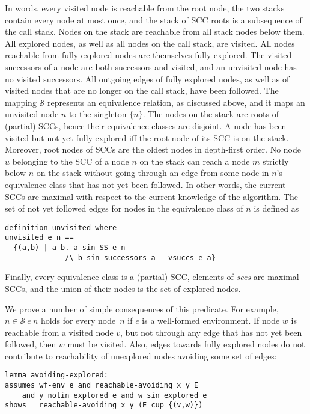 \documentclass[sigplan,10pt,anonymous,review]{acmart}
\newcommand{\prog}[1]{\textit{#1}}
\renewcommand{\SS}{\mathcal{S}}
\begin{document}
In words, every visited node is reachable from the root node, the two stacks contain every node at most once, and the stack of SCC roots is a subsequence of the call stack. Nodes on the stack are reachable from all stack nodes below them. All explored nodes, as well as all nodes on the call stack, are visited. All nodes reachable from fully explored nodes are themselves fully explored. The visited successors of a node are both successors and visited, and an unvisited node has no visited successors. All outgoing edges of fully explored nodes, as well as of visited nodes that are no longer on the call stack, have been followed. The mapping $\SS$ represents an equivalence relation, as discussed above, and it maps an unvisited node $n$ to the singleton $\{n\}$. The nodes on the stack are roots of (partial) SCCs, hence their equivalence classes are disjoint. A node has been visited but not yet fully explored iff the root node of its SCC is on the stack. Moreover, root nodes of SCCs are the oldest nodes in depth-first order. No node $u$ belonging to the SCC of a node $n$ on the stack can reach a node $m$ strictly below $n$ on the stack without going through an edge from some node in $n$'s equivalence class that has not yet been followed. In other words, the current SCCs are maximal with respect to the current knowledge of the algorithm. The set of not yet followed edges for nodes in the equivalence class of $n$ is defined as
%
\begin{small}
\begin{lstlisting}[language=isabelle]
definition unvisited where
unvisited e n ==
  {(a,b) | a b. a sin SS e n 
              /\ b sin successors a - vsuccs e a}
\end{lstlisting}
\end{small}
%
Finally, every equivalence class is a (partial) SCC, elements of \prog{sccs} are maximal SCCs, and the union of their nodes is the set of explored nodes.

We prove a number of simple consequences of this predicate. For example, $n \in \SS~e~n$ holds for every node~$n$ if $e$ is a well-formed environment. If node $w$ is reachable from a visited node $v$, but not through any edge that has not yet been followed, then $w$ must be visited. Also, edges towards fully explored nodes do not contribute to reachability of unexplored nodes avoiding some set of edges:
%
\begin{small}
\begin{lstlisting}[language=isabelle]
lemma avoiding-explored:
assumes wf-env e and reachable-avoiding x y E
    and y notin explored e and w sin explored e
shows   reachable-avoiding x y (E cup {(v,w)})
\end{lstlisting}
\end{small}
\end{document}
